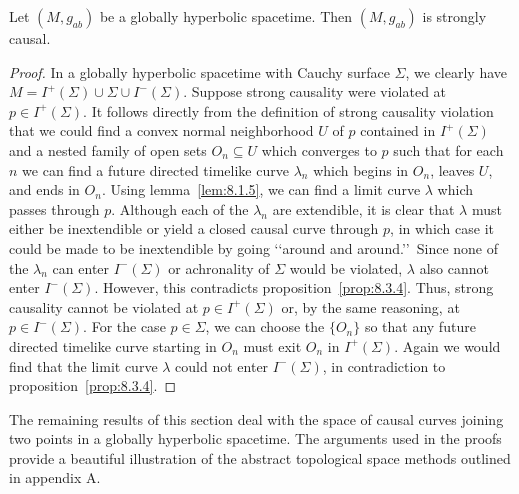 \begin{lemma}\label{lem:8.3.8}
Let \((M,g_{ab})\) be a globally hyperbolic spacetime. Then \((M,g_{ab})\) is
strongly causal.
\end{lemma}
\begin{proof}
In a globally hyperbolic spacetime with Cauchy surface \(\Sigma\), we clearly have
\(M=I^+(\Sigma)\cup\Sigma\cup I^-(\Sigma)\). Suppose strong causality were violated
at \(p\in I^+(\Sigma)\). It follows directly from the definition of strong causality
violation that we could find a convex normal neighborhood \(U\) of \(p\) contained in
\(I^+(\Sigma)\) and a nested family of open sets \(O_n\subseteq U\) which converges
to \(p\) such that for each \(n\) we can find a future directed timelike curve
\(\lambda_n\) which begins in \(O_n\), leaves \(U\), and ends in \(O_n\). Using
lemma~\ref{lem:8.1.5}, we can find a limit curve \(\lambda\) which passes through
\(p\). Although each of the \(\lambda_n\) are extendible, it is clear that
\(\lambda\) must either be inextendible or yield a closed causal curve through \(p\),
in which case it could be made to be inextendible by going \lq\lq around and around.\rq\rq\
Since none of the \(\lambda_n\) can enter \(I^-(\Sigma)\) or achronality of
\(\Sigma\) would be violated, \(\lambda\) also cannot enter \(I^-(\Sigma)\).
However, this contradicts proposition~\ref{prop:8.3.4}. Thus, strong causality
cannot be violated at \(p\in I^+(\Sigma)\) or, by the same reasoning, at
\(p\in I^-(\Sigma)\). For the case \(p\in\Sigma\), we can choose the \(\{O_n\}\)
so that any future directed timelike curve starting in \(O_n\) must exit \(O_n\) in
\(I^+(\Sigma)\). Again we would find that the limit curve \(\lambda\) could not
enter \(I^-(\Sigma)\), in contradiction to proposition~\ref{prop:8.3.4}.
\end{proof}

The remaining results of this section deal with the space of causal curves joining
two points in a globally hyperbolic spacetime. The arguments used in the proofs
provide a beautiful illustration of the abstract topological space methods outlined in
appendix A.

